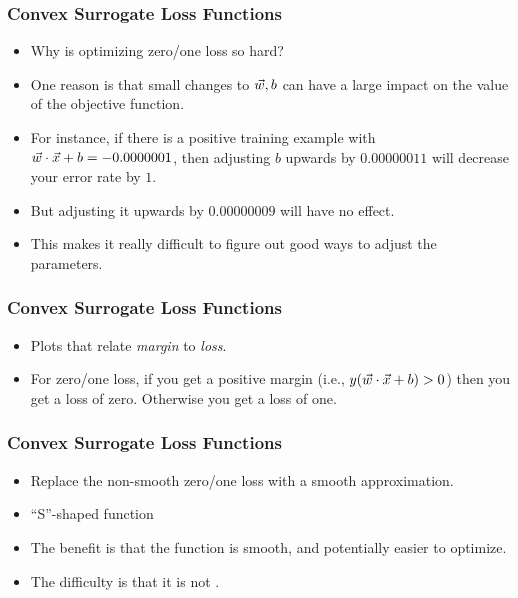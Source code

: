 \documentclass[trans,aspectratio=169]{beamer}
\begin{document}
\begin{frame}
  \frametitle{Convex Surrogate Loss Functions}
\begin{itemize}
\item 
Why is optimizing zero/one loss so hard?  
\item One reason is that small changes to ${\vec w},b$ can have a large impact on
the value of the objective function. 
\item For instance, if there is a
positive training example with ${\vec w} \cdot {\vec x}+b = -0.0000001$, then
adjusting $b$ upwards by $0.00000011$ will decrease your error rate by
$1$. 
\item But adjusting it upwards by $0.00000009$ will have no effect.
\item This makes it really difficult to figure out good ways to adjust the
parameters.
\end{itemize}
\end{frame}

\begin{frame}
  \frametitle{Convex Surrogate Loss Functions}
\begin{itemize}
\item 
Plots that relate
\emph{margin} to \emph{loss}.
\item For zero/one loss, if you get a positive margin (i.e., $y({\vec w} \cdot {\vec x}+b)>0$)
then you get a loss of zero.  Otherwise you get a loss of one. 
\end{itemize}
\end{frame}

\begin{frame}
  \frametitle{Convex Surrogate Loss Functions}
\begin{itemize}
\item Replace the non-smooth zero/one loss with a smooth approximation.
\item  ``S''-shaped
function 
\item The
benefit  is that the function is smooth, and
potentially easier to optimize. 
\item The difficulty is that it is not
.
\end{itemize}
\end{frame}
\end{document}
